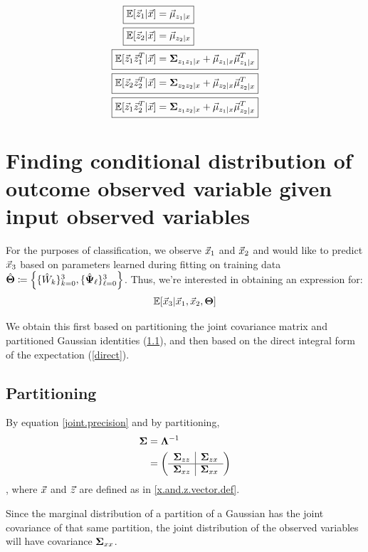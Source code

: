 \begin{align}
 \Aboxed{ \ev[\z_1| \x] &=  \vmu_{z_1 |x} } \label{postexp:1} \\
\Aboxed{  \ev[\z_2| \x] &=  \vmu_{z_2 |x} }\\
\Aboxed{  \ev[\z_1\z_1^T | \x] &= \bSigma_{z_1z_1|x} +
                         \vmu_{z_1|x}\vmu_{z_1|x}^T}\\
\Aboxed{    \ev[\z_2\z_2^T | \x] &= \bSigma_{z_2z_2|x} +
                           \vmu_{z_2|x}\vmu_{z_2|x}^T }\\
\Aboxed{      \ev[\z_1\z_2^T | \x] &= \bSigma_{z_1z_2|x} + \vmu_{z_1|x}\vmu_{z_2|x}^T                }\label{postexp:5}
\end{align}


\pagebreak %
\section{Finding conditional distribution of outcome observed variable
  given input observed variables}
For the purposes of classification, we observe $\vec{x}_1$ and $\vec{x}_2$ and
would like to predict $\vec{x}_3$ based on parameters learned during
fitting on training data $\hat{\bold{\Theta}} \coloneqq \left\{ \{\hat{W}_k\}_{k=0}^3 ,
  \{\hat{\bold{\Psi}}_\ell\}_{\ell=0}^3  \right\}$. Thus, we're interested in
obtaining an expression for:
\begin{align}
\mathbb{E} [ \vec{x}_3 | \vec{x}_1, \vec{x}_2, \bold{\Theta}]
\end{align}

We obtain this first based on partitioning the joint covariance matrix and
partitioned Gaussian identities (\ref{partitioning}), and then based on the direct integral form of the expectation (\ref{direct}).
\subsection{Partitioning} \label{partitioning}
By equation \ref{joint.precision} and by partitioning, 
\begin{align}
  \bold{\Sigma} &=  \bold{\Lambda}^{-1} \\
&= \left(
  \begin{array}{c|c}
      \bold{\Sigma}_{zz} & \bold{\Sigma}_{zx} \\ \hline
      \bold{\Sigma}_{xz} & \bold{\Sigma}_{xx} \\
  \end{array}
  \right) 
\end{align}, where $\vec{x}$ and $\vec{z}$ are defined as in \ref{x.and.z.vector.def}.


Since the marginal distribution of a partition of a Gaussian has
the joint covariance of that same partition, the joint distribution
of the observed variables will have covariance $\bold{\Sigma}_{xx}$. 


